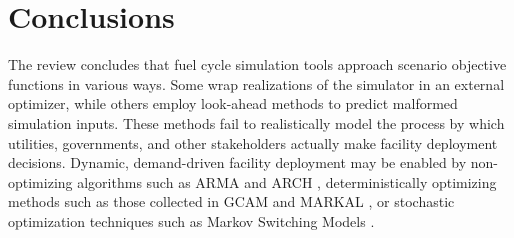\section{Conclusions}


        The review concludes that fuel cycle simulation tools approach scenario objective functions in 
        various ways.  Some wrap realizations of the simulator in an external 
        optimizer, while others employ look-ahead methods to predict malformed 
        simulation inputs.  These methods fail to realistically model the 
        process by which utilities, governments, and other stakeholders 
        actually make facility deployment decisions. Dynamic, demand-driven 
        facility deployment may be enabled by non-optimizing algorithms such as 
        \gls{ARMA} \cite{woodard_stationarity_2011} and \gls{ARCH} 
        \cite{li_kernel_2016}, deterministically 
        optimizing methods such as those collected in \gls{GCAM} 
        \cite{edmonds_advanced_1994} and \gls{MARKAL} 
        \cite{fishbone_markal_1981}, or stochastic optimization 
        techniques such as Markov Switching Models \cite{ansari_predicting_2015}.
